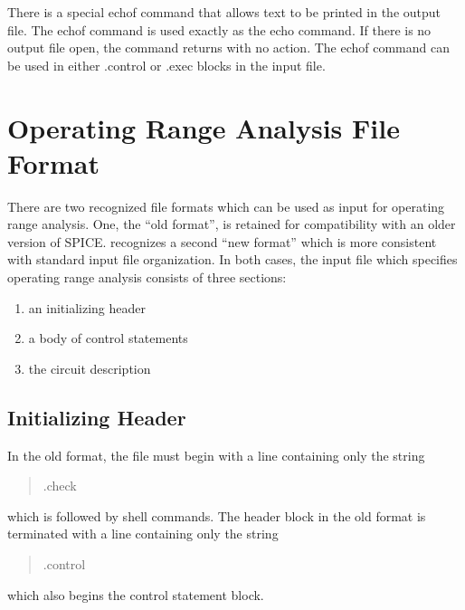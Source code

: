 There is a special {\cb echof} command that allows text to be printed
in the output file.  The {\cb echof} command is used exactly as the
{\cb echo} command.  If there is no output file open, the command
returns with no action.  The {\cb echof} command can be used in either
{\vt .control} or {\vt .exec} blocks in the input file.


\section{Operating Range Analysis File Format}


There are two recognized file formats which can be used as input for
operating range analysis.  One, the ``old format'', is retained for
compatibility with an older version of SPICE.  {\WRspice} recognizes a
second ``new format'' which is more consistent with standard {\WRspice}
input file organization.  In both cases, the input file which
specifies operating range analysis consists of three sections:

\begin{enumerate}
\item an initializing header
\item a body of control statements
\item the circuit description
\end{enumerate}

\subsection{Initializing Header}
In the old format, the file must begin with a line containing only the
string
\begin{quote}
{\vt .check}
\end{quote}
which is followed by shell commands.  The header block in the old format
is terminated with a line containing only the string
\begin{quote}
{\vt .control}
\end{quote}
which also begins the control statement block.

